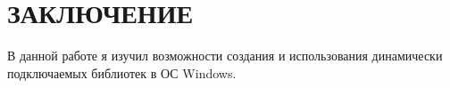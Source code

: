 \section*{ЗАКЛЮЧЕНИЕ}

В данной работе я изучил возможности создания и использования динамически
подключаемых библиотек в ОС Windows.

\newpage